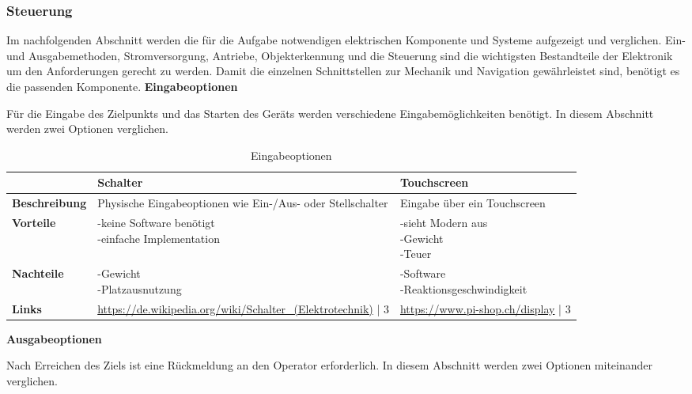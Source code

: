 \newpage
\subsubsection{Steuerung}

Im nachfolgenden Abschnitt werden die für die Aufgabe notwendigen elektrischen Komponente und Systeme aufgezeigt und verglichen.  Ein- und Ausgabemethoden, Stromversorgung, Antriebe, Objekterkennung und die Steuerung sind die wichtigsten Bestandteile der Elektronik um den Anforderungen gerecht zu werden. Damit die einzelnen Schnittstellen zur Mechanik und Navigation gewährleistet sind, benötigt es die passenden Komponente.
\textbf{Eingabeoptionen}

Für die Eingabe des Zielpunkts und das Starten des Geräts werden verschiedene Eingabemöglichkeiten benötigt. In diesem Abschnitt werden zwei Optionen verglichen.

\begin{table}[H]
\centering
\small
\begin{tabularx}{\textwidth}{|l|X|X|}
\hline
  \textbf{} & \textbf{Schalter} & \textbf{Touchscreen} \\
  \hline
  \textbf{Beschreibung}  & Physische Eingabeoptionen wie Ein-/Aus- oder Stellschalter & Eingabe über ein Touchscreen\\
  \hline
  \textbf{Vorteile}  & \makecell{-keine Software benötigt\\-einfache Implementation} & \makecell{-sieht Modern aus \\ -Gewicht \\-Teuer}\\
  \hline
  \textbf{Nachteile} & \makecell{-Gewicht \\-Platzausnutzung} & \makecell{-Software\\-Reaktionsgeschwindigkeit}\\
  \hline
  \textbf{Links} &  \url{https://de.wikipedia.org/wiki/Schalter_(Elektrotechnik)} | 3 & \url{https://www.pi-shop.ch/display} | 3\\
  \hline
\end{tabularx}
\caption{Eingabeoptionen}
\label{table:inputs-compare}
\end{table}

\textbf{Ausgabeoptionen}

Nach Erreichen des Ziels ist eine Rückmeldung an den Operator erforderlich. In diesem Abschnitt werden zwei Optionen miteinander verglichen.

